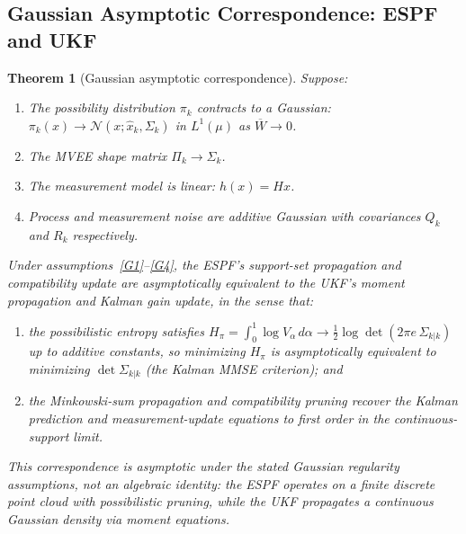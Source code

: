 \documentclass[12pt]{article}
\newtheorem{theorem}{Theorem}[section]
\newcommand{\Lone}{L^1}
\begin{document}
\subsection{Gaussian Asymptotic Correspondence: ESPF and UKF}

\begin{theorem}[Gaussian asymptotic correspondence]
\label{thm:espf_ukf}
Suppose:
\begin{enumerate}[label=\textup{(G\arabic*)},ref=G\arabic*]
\item\label{G1} The possibility distribution $\pi_k$ contracts to a Gaussian:
  $\pi_k(x)\to\mathcal{N}(x;\hat{x}_k,\Sigma_k)$ in $\Lone(\mu)$ as $\overline{W}\to 0$.
\item\label{G2} The MVEE shape matrix $\Pi_k\to\Sigma_k$.
\item\label{G3} The measurement model is linear: $h(x)=Hx$.
\item\label{G4} Process and measurement noise are additive Gaussian with
  covariances $Q_k$ and $R_k$ respectively.
\end{enumerate}
Under assumptions~\eqref{G1}--\eqref{G4}, the ESPF's support-set propagation
and compatibility update are \emph{asymptotically equivalent} to the UKF's
moment propagation and Kalman gain update, in the sense that:
\begin{enumerate}[label=\textup{(\roman*)}]
\item the possibilistic entropy satisfies
  $H_\pi = \int_0^1\log V_\alpha\,d\alpha \to \tfrac{1}{2}\log\det(2\pi e\,\Sigma_{k|k})$
  up to additive constants, so minimizing $H_\pi$ is asymptotically equivalent
  to minimizing $\det\Sigma_{k|k}$ (the Kalman MMSE criterion); and
\item the Minkowski-sum propagation and compatibility pruning recover the Kalman
  prediction and measurement-update equations to first order in the
  continuous-support limit.
\end{enumerate}
This correspondence is asymptotic under the stated Gaussian regularity assumptions,
not an algebraic identity: the ESPF operates on a finite discrete point cloud
with possibilistic pruning, while the UKF propagates a continuous Gaussian
density via moment equations.
\end{theorem}
\end{document}
